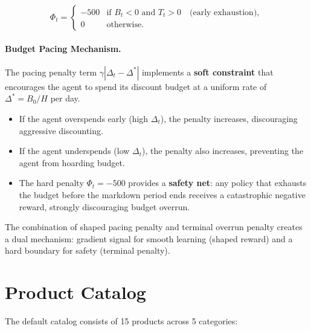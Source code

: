 \documentclass[11pt,a4paper]{article}
\begin{document}
\begin{equation}
\Phi_t = \begin{cases}
-500 & \text{if } B_t < 0 \text{ and } T_t > 0 \quad \text{(early exhaustion)}, \\
0 & \text{otherwise}.
\end{cases}
\end{equation}

\paragraph{Budget Pacing Mechanism.}

The pacing penalty term $\gamma |\Delta_t - \Delta^*|$ implements a \textbf{soft constraint} that encourages the agent to spend its discount budget at a uniform rate of $\Delta^* = B_0 / H$ per day.
\begin{itemize}
    \item If the agent overspends early (high $\Delta_t$), the penalty increases, discouraging aggressive discounting.
    \item If the agent underspends (low $\Delta_t$), the penalty also increases, preventing the agent from hoarding budget.
    \item The hard penalty $\Phi_t = -500$ provides a \textbf{safety net}: any policy that exhausts the budget before the markdown period ends receives a catastrophic negative reward, strongly discouraging budget overrun.
\end{itemize}

The combination of shaped pacing penalty and terminal overrun penalty creates a dual mechanism: gradient signal for smooth learning (shaped reward) and a hard boundary for safety (terminal penalty).

\section{Product Catalog}
\label{sec:catalog}

The default catalog consists of 15 products across 5 categories:
\end{document}
